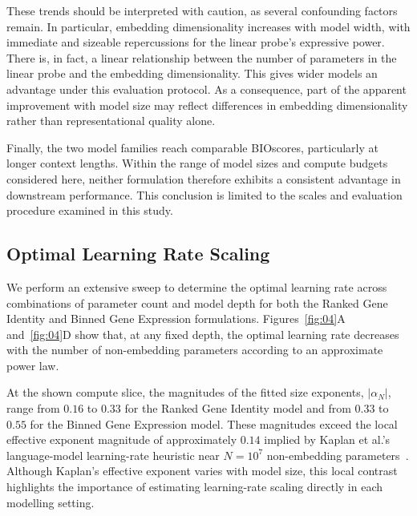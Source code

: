 \documentclass[pdflatex,sn-nature]{sn-jnl}%
\theoremstyle{thmstyleone}%
\theoremstyle{thmstyletwo}%
\theoremstyle{thmstylethree}%
\begin{document}
These trends should be interpreted with caution, as several confounding factors remain. 
In particular, embedding dimensionality increases with model width, with immediate and sizeable repercussions for the linear probe's expressive power. There is, in fact, a linear relationship between the number of parameters in the linear probe and the embedding dimensionality.
This gives wider models an advantage under this evaluation protocol. 
As a consequence, part of the apparent improvement with model size may reflect differences in embedding dimensionality rather than representational quality alone.

Finally, the two model families reach comparable BIOscores, particularly at longer context lengths. 
Within the range of model sizes and compute budgets considered here, neither formulation therefore exhibits a consistent advantage in downstream performance.
This conclusion is limited to the scales and evaluation procedure examined in this study.


\subsection{Optimal Learning Rate Scaling}

We perform an extensive sweep to determine the optimal learning rate across combinations of parameter count and model depth for both the Ranked Gene Identity and Binned Gene Expression formulations.
Figures~\ref{fig:04}A and~\ref{fig:04}D show that, at any fixed depth, the optimal learning rate decreases with the number of non-embedding parameters according to an approximate power law.

At the shown compute slice, the magnitudes of the fitted size exponents, \(\lvert\alpha_N\rvert\), range from \(0.16\) to \(0.33\) for the Ranked Gene Identity model and from \(0.33\) to \(0.55\) for the Binned Gene Expression model.
These magnitudes exceed the local effective exponent magnitude of approximately $0.14$ implied by Kaplan et al.'s language-model learning-rate heuristic near $N=10^7$ non-embedding parameters~\cite{Kaplan2020}.
Although Kaplan's effective exponent varies with model size, this local contrast highlights the importance of estimating learning-rate scaling directly in each modelling setting.
\end{document}
